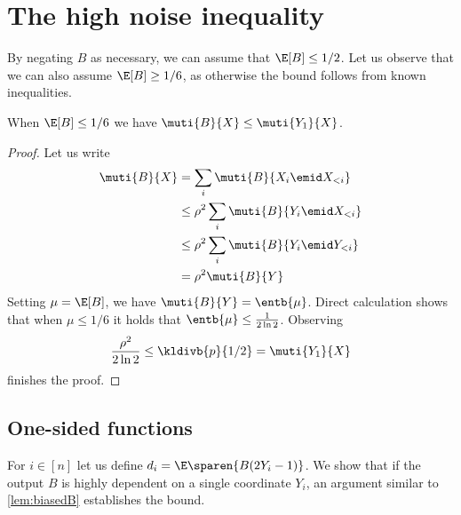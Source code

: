 \newpage
\label{sec:high-noise}
\section{The high noise inequality}
By negating $B$ as necessary, we can assume that
$\E[B]\le 1/2$. Let us observe that we can also assume
$\E[B]\ge1/6$, as otherwise the bound follows from
known inequalities.
\begin{lemma}
\label{lem:biasedB}
When $\E[B]\le1/6$ we have $\muti{B}{X}\le\muti{Y_1}{X}$.
\end{lemma}
\begin{proof}
Let us write
\begin{align*}
\muti{B}{X} &= \sum_i \muti{B}{X_i \emid X_{<i}}\\
  &\le \rho^2\sum_i \muti{B}{Y_i \emid X_{<i}}\\
  &\le \rho^2\sum_i \muti{B}{Y_i \emid Y_{<i}}\\
  &  = \rho^2 \muti{B}{Y}
\end{align*}
Setting $\mu=\E[B]$, we have $\muti{B}{Y}=\entb{\mu}$.
Direct calculation shows that when $\mu\le 1/6$ it holds
that $\entb{\mu}\le \frac{1}{2\ln 2}$. Observing
\begin{align*}
\frac{\rho^2}{2\ln 2} \le \kldivb{p}{1/2} = \muti{Y_1}{X}
\end{align*}
finishes the proof.
\end{proof}

\subsection{One-sided functions}
For $i\in[n]$ let us define $d_i =\E\sparen{B(2Y_i - 1)}$.
We show that if the output $B$ is highly dependent on a single
coordinate $Y_i$, an argument similar to 
\autoref{lem:biasedB} establishes the bound.

